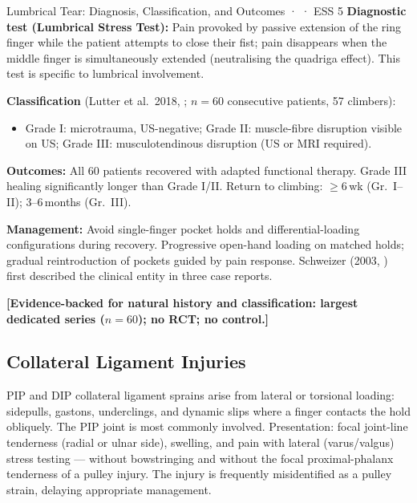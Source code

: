 \begin{evidencebox}{Lumbrical Tear: Diagnosis, Classification, and Outcomes · \evidencebacked · ESS 5}
\textbf{Diagnostic test (Lumbrical Stress Test):} Pain provoked by passive extension of the ring finger while the patient attempts to close their fist; pain disappears when the middle finger is simultaneously extended (neutralising the quadriga effect). This test is specific to lumbrical involvement.

\textbf{Classification} (Lutter et al.\ 2018, \cite{LSS+18}; $n=60$ consecutive patients, 57 climbers):
\begin{itemize}[leftmargin=1.5em,noitemsep]
  \item Grade I: microtrauma, US-negative; Grade II: muscle-fibre disruption visible on US; Grade III: musculotendinous disruption (US or MRI required).
\end{itemize}
\textbf{Outcomes:} All 60 patients recovered with adapted functional therapy. Grade III healing significantly longer than Grade I/II. Return to climbing: $\geq$6\,wk (Gr.~I--II); 3--6\,months (Gr.~III).

\textbf{Management:} Avoid single-finger pocket holds and differential-loading configurations during recovery. Progressive open-hand loading on matched holds; gradual reintroduction of pockets guided by pain response. Schweizer (2003, \cite{Sch03}) first described the clinical entity in three case reports.

\textbf{[Evidence-backed for natural history and classification: largest dedicated series \cite{LSS+18} ($n=60$); no RCT; no control.]}
\end{evidencebox}

\subsection{Collateral Ligament Injuries}
\label{subsec:collateral}

PIP and DIP collateral ligament sprains arise from lateral or torsional loading: sidepulls, gastons, underclings, and dynamic slips where a finger contacts the hold obliquely. The PIP joint is most commonly involved. Presentation: focal joint-line tenderness (radial or ulnar side), swelling, and pain with lateral (varus/valgus) stress testing --- without bowstringing and without the focal proximal-phalanx tenderness of a pulley injury. The injury is frequently misidentified as a pulley strain, delaying appropriate management.


